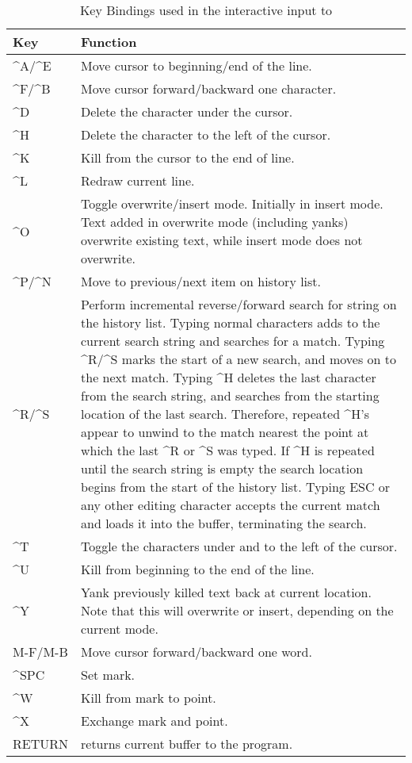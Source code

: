 \begin{longtable}{lp{4.0in}}
\caption{Key Bindings used in the interactive input to \aprepro{}} \\
\hline
Key & Function \\
\hline
\endhead
\^{}A/\^{}E & Move cursor to beginning/end of the line. \\
\^{}F/\^{}B & Move cursor forward/backward one character. \\
\^{}D       & Delete the character under the cursor. \\
\^{}H       & Delete the character to the left of the cursor. \\
\^{}K       & Kill from the cursor to the end of line. \\
\^{}L       & Redraw current line. \\
\^{}O       & Toggle overwrite/insert mode. Initially in insert mode. Text
              added in overwrite mode (including yanks) overwrite
              existing text, while insert mode does not overwrite. \\
\^{}P/\^{}N & Move to previous/next item on history list. \\
\^{}R/\^{}S & Perform incremental reverse/forward search for string on
              the history list.  Typing normal characters adds to the current
              search string and searches for a match. Typing \^{}R/\^{}S marks
              the start of a new search, and moves on to the next match.
              Typing \^{}H deletes the last character from the search
              string, and searches from the starting location of the last search.
              Therefore, repeated \^{}H's appear to unwind to the match nearest
              the point at which the last \^{}R or \^{}S was typed.  If \^{}H is
              repeated until the search string is empty the search location
              begins from the start of the history list.  Typing ESC or
              any other editing character accepts the current match and
              loads it into the buffer, terminating the search.  \\
\^{}T       & Toggle the characters under and to the left of the cursor.  \\
\^{}U       & Kill from beginning to the end of the line. \\
\^{}Y       & Yank previously killed text back at current location.  Note that
              this will overwrite or insert, depending on the current mode. \\
M-F/M-B     & Move cursor forward/backward one word. \\
\^{}SPC     & Set mark. \\
\^{}W       & Kill from mark to point. \\
\^{}X       & Exchange mark and point. \\
RETURN      & returns current buffer to the program.
\end{longtable}
